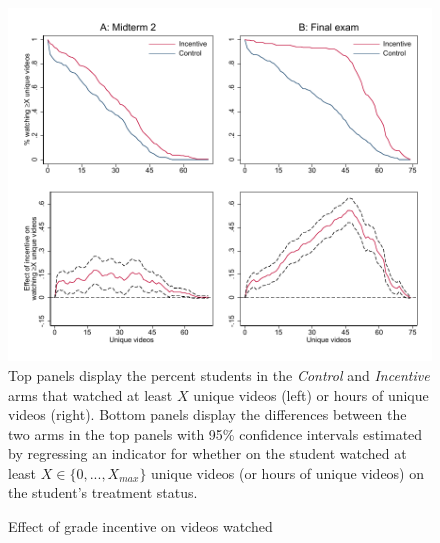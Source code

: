 \documentclass[12pt]{article}
\begin{document}
\clearpage


\clearpage


\clearpage



\clearpage
\begin{figure}[t]
\begin{center}
\caption{Effect of grade incentive on videos watched}
\label{combo_cdf}
\includegraphics[width=1\textwidth, angle=0]{../plots/combo_cdf.pdf}
\footnotesize Top panels display the percent students in the \textit{Control}
 and \textit{Incentive} arms that watched at least $X$ unique videos (left) or hours of unique videos (right). Bottom panels display the differences between the two arms in the top panels with 95\% confidence intervals estimated by regressing an indicator for whether on the student watched at least $X\in\{0,...,X_{max}\}$ unique videos (or hours of unique videos) on the student's treatment status.
\end{center}
\end{figure}
\end{document}
